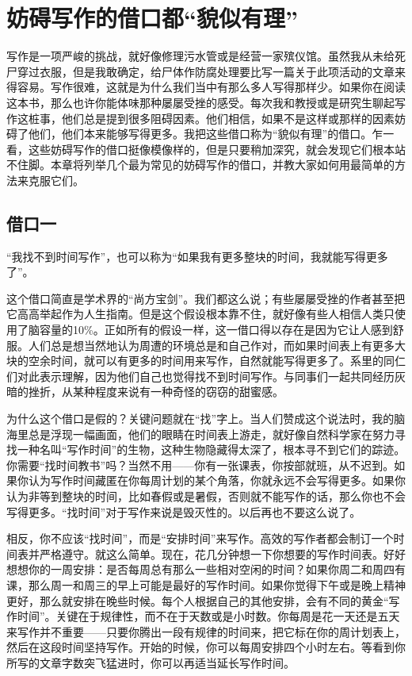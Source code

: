 \chapter{妨碍写作的借口都“貌似有理”}
写作是一项严峻的挑战，就好像修理污水管或是经营一家殡仪馆。虽然我从未给死尸穿过衣服，但是我敢确定，给尸体作防腐处理要比写一篇关于此项活动的文章来得容易。写作很难，这就是为什么我们当中有那么多人写得那样少。如果你在阅读这本书，那么也许你能体味那种屡屡受挫的感受。每次我和教授或是研究生聊起写作这桩事，他们总是提到很多阻碍因素。他们相信，如果不是这样或那样的因素妨碍了他们，他们本来能够写得更多。我把这些借口称为“貌似有理”的借口。乍一看，这些妨碍写作的借口挺像模像样的，但是只要稍加深究，就会发现它们根本站不住脚。本章将列举几个最为常见的妨碍写作的借口，并教大家如何用最简单的方法来克服它们。

\section{借口一}
“我找不到时间写作”，也可以称为“如果我有更多整块的时间，我就能写得更多了”。

这个借口简直是学术界的“尚方宝剑”。我们都这么说；有些屡屡受挫的作者甚至把它高高举起作为人生指南。但是这个假设根本靠不住，就好像有些人相信人类只使用了脑容量的10\%。正如所有的假设一样，这一借口得以存在是因为它让人感到舒服。人们总是想当然地认为周遭的环境总是和自己作对，而如果时间表上有更多大块的空余时间，就可以有更多的时间用来写作，自然就能写得更多了。系里的同仁们对此表示理解，因为他们自己也觉得找不到时间写作。与同事们一起共同经历灰暗的挫折，从某种程度来说有一种奇怪的窃窃的甜蜜感。

为什么这个借口是假的？关键问题就在“找”字上。当人们赞成这个说法时，我的脑海里总是浮现一幅画面，他们的眼睛在时间表上游走，就好像自然科学家在努力寻找一种名叫“写作时间”的生物，这种生物隐藏得太深了，根本寻不到它们的踪迹。你需要“找时间教书”吗？当然不用——你有一张课表，你按部就班，从不迟到。如果你认为写作时间藏匿在你每周计划的某个角落，你就永远不会写得更多。如果你认为非等到整块的时间，比如春假或是暑假，否则就不能写作的话，那么你也不会写得更多。“找时间”对于写作来说是毁灭性的。以后再也不要这么说了。

相反，你不应该“找时间”，而是“安排时间”来写作。高效的写作者都会制订一个时间表并严格遵守。就这么简单。现在，花几分钟想一下你想要的写作时间表。好好想想你的一周安排：是否每周总有那么一些相对空闲的时间？如果你周二和周四有课，那么周一和周三的早上可能是最好的写作时间。如果你觉得下午或是晚上精神更好，那么就安排在晚些时候。每个人根据自己的其他安排，会有不同的黄金“写作时间”。关键在于规律性，而不在于天数或是小时数。你每周是花一天还是五天来写作并不重要——只要你腾出一段有规律的时间来，把它标在你的周计划表上，然后在这段时间坚持写作。开始的时候，你可以每周安排四个小时左右。等看到你所写的文章字数突飞猛进时，你可以再适当延长写作时间。

